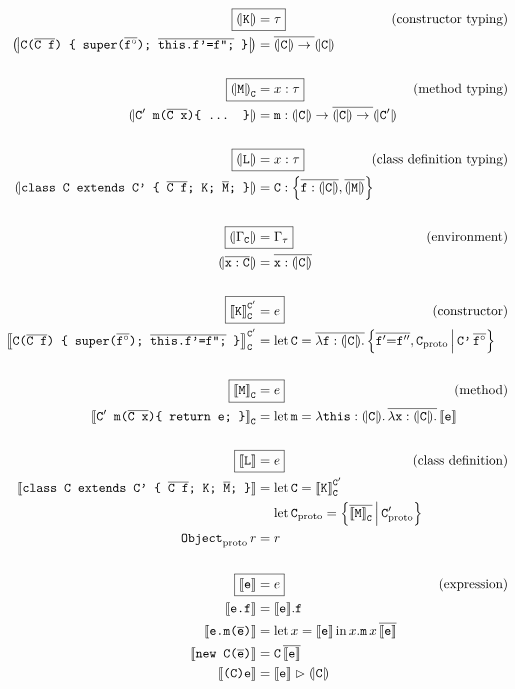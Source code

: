 \begin{align*}    
    \Aboxed{\denoty{\fj K} &= \tau} & \makebox[0mm][r]{(constructor typing)} \\
    \denoty{\fjconsdef} &= \overline{\denoty{\fj C} \to {}} \denoty{\fj{C}} \\
    \\
    \Aboxed{\denoty{\fj M}_{\fj C} &= x : \tau} & \makebox[0mm][r]{(method typing)} \\
    \denoty{\fjmethdefx} &= \fj m : \denoty{\fj C} \to \overline{\denoty{\fj C} \to {}} \denoty{\fj{C}'} \\
    \\
    \Aboxed{\denoty{\fj L} &= x : \tau} & \makebox[0mm][r]{(class definition typing)} \\
    \denoty{\fjclassdef} &= \fj C : \flrec{\overline{\fj{f}: \denoty{\fj{C}}}, \overline{\denoty{\fj M}}} \\
    \\
    \Aboxed{\denoty{\Gamma_{\fj C}} &= \Gamma_\tau} & \makebox[0mm][r]{(environment)} \\
    \denoty{\overline{\fj x : \fj C}} &= \overline{\fj x : \denoty{\fj C}} \\
    \\
    \Aboxed{\denot{\fj K}_{\fj{C}}^{\fj{C}'} &= e}  & \makebox[0mm][r]{(constructor)} \\
    \denot{\fjconsdef}_{\fj{C}}^{\fj{C}'} &= \flletx{\fj C}{\overline{\fllam{\fj f : \denoty{\fj C}}}\, \flext{\overline{\fj{f}'{=}\fj{f}''}, \fj C_\mathrm{proto}}{\fj{C'}\,\overline{\fj{f}^\circ}}}
    \\ \\
    \Aboxed{\denot{\fj M}_{\fj C} &= e} & \makebox[0mm][r]{(method)} \\
    \denot{\fjmethdef}_{\fj C} &= \flletx{\fj m}{\fllam{\fj{this} : \denoty{\fj C}} \overline{\fllam{\fj x: \denoty{\fj C}}}\, \denot{\fj e}}
    \\ \\
    \Aboxed{\denot{\fj L} &= e} & \makebox[0mm][r]{(class definition)} \\
    \denot{\fjclassdef} &= \flletx{\fj C}{\denot{\fj K}_{\fj C}^{\fj C'}} \\
    &\phantom{{}={}} \flletx{\fj{C}_\mathrm{proto}}{\flext{\overline{\denot{\fj M}_{\fj C}}}{\fj C'_\mathrm{proto}}} \\
    \fj{Object}_\mathrm{proto}\,r &= r
    \\ \\
    \Aboxed{\denot{\fj e} &= e} & \makebox[0mm][r]{(expression)} \\
    \denot{\fj {e.f}} &= \flproj{\denot{\fj e}}{\fj f} \\
    \denot{\fj {e.m(\fjoverline e)}} &= \fllet{x}{\denot{\fj e}} \flproj{x}{\fj m}\,x\,\overline{\denot{\fj e}} \\
    \denot{\fj {new C(\fjoverline e)}} &= \fj{C}\,\overline{\denot{\fj e}} \\
    \denot{\fj {(C)e}} &= \flcast{\denot {\fj e}}{\denoty {\fj C}} 
\end{align*}